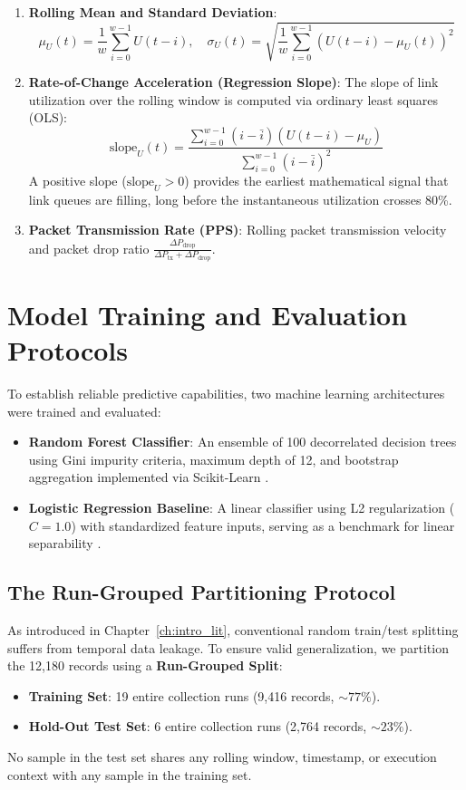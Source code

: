 \begin{enumerate}
  \item \textbf{Rolling Mean and Standard Deviation}:
  \begin{equation}
    \mu_U(t) = \frac{1}{w} \sum_{i=0}^{w-1} U(t - i), \quad \sigma_U(t) = \sqrt{\frac{1}{w} \sum_{i=0}^{w-1} (U(t - i) - \mu_U(t))^2}
  \end{equation}
  \item \textbf{Rate-of-Change Acceleration (Regression Slope)}:
  The slope of link utilization over the rolling window is computed via ordinary least squares (OLS):
  \begin{equation}
    \text{slope}_U(t) = \frac{\sum_{i=0}^{w-1} (i - \bar{i})(U(t - i) - \mu_U)}{\sum_{i=0}^{w-1} (i - \bar{i})^2}
  \end{equation}
  A positive slope ($\text{slope}_U > 0$) provides the earliest mathematical signal that link queues are filling, long before the instantaneous utilization crosses 80\%.
  \item \textbf{Packet Transmission Rate (PPS)}: Rolling packet transmission velocity and packet drop ratio $\frac{\Delta P_{\text{drop}}}{\Delta P_{\text{tx}} + \Delta P_{\text{drop}}}$.
\end{enumerate}

\section{Model Training and Evaluation Protocols}
To establish reliable predictive capabilities, two machine learning architectures were trained and evaluated:
\begin{itemize}
  \item \textbf{Random Forest Classifier}: An ensemble of 100 decorrelated decision trees using Gini impurity criteria, maximum depth of 12, and bootstrap aggregation implemented via Scikit-Learn \cite{breiman2001random,pedregosa2011scikit}.
  \item \textbf{Logistic Regression Baseline}: A linear classifier using L2 regularization ($C=1.0$) with standardized feature inputs, serving as a benchmark for linear separability \cite{pedregosa2011scikit}.
\end{itemize}

\subsection{The Run-Grouped Partitioning Protocol}
As introduced in Chapter~\ref{ch:intro_lit}, conventional random train/test splitting suffers from temporal data leakage. To ensure valid generalization, we partition the 12,180 records using a \textbf{Run-Grouped Split}:
\begin{itemize}
  \item \textbf{Training Set}: 19 entire collection runs (9,416 records, $\sim 77\%$).
  \item \textbf{Hold-Out Test Set}: 6 entire collection runs (2,764 records, $\sim 23\%$).
\end{itemize}
No sample in the test set shares any rolling window, timestamp, or execution context with any sample in the training set.

